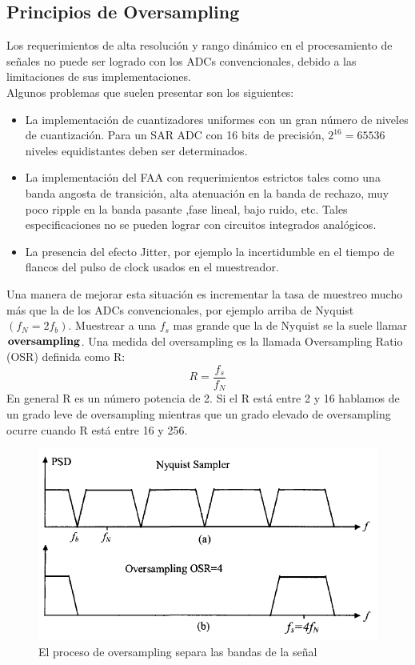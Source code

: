 \documentclass[assd_tp3_main.tex]{subfiles}
\begin{document}
\subsection{Principios de Oversampling}
Los requerimientos de alta resolución y rango dinámico en el procesamiento de señales no puede ser logrado con los ADCs convencionales, debido a las limitaciones de sus implementaciones.\\
Algunos problemas que suelen presentar son los siguientes:
\begin{itemize}
\item La implementación de cuantizadores uniformes con un gran número de niveles de cuantización. Para un SAR ADC con 16 bits de precisión, $2^{16}=65536$ niveles equidistantes deben ser determinados.
\item La implementación del FAA con requerimientos estrictos tales como una banda angosta de transición, alta atenuación en la banda de rechazo, muy poco ripple en la banda pasante ,fase lineal, bajo ruido, etc. Tales especificaciones no se pueden lograr con circuitos integrados analógicos.
\item La presencia del efecto Jitter, por ejemplo la incertidumble en el tiempo de flancos del pulso de clock usados en el muestreador. 
\end{itemize}
Una manera de mejorar esta situación es incrementar la tasa de muestreo mucho más que la de los ADCs convencionales, por ejemplo arriba de Nyquist $(f_{N}=2f_b)$. Muestrear a una $f_s$ mas grande que la de Nyquist se la suele llamar $\bold{oversampling}$.
Una medida del oversampling es la llamada Oversampling Ratio (OSR) definida como R:
\[ R=\frac{f_s}{f_N} \]
En general R es un número potencia de 2. Si el R está entre 2 y 16 hablamos de un grado leve de oversampling mientras que un grado elevado de oversampling ocurre cuando R está entre 16 y 256.

\begin{figure}[H]
\centering
\includegraphics[width=0.52\linewidth]{images/ej4/oversampling.png}
\caption{El proceso de oversampling separa las bandas de la señal}
\label{fig:oversampling}
\end{figure}
\end{document}
